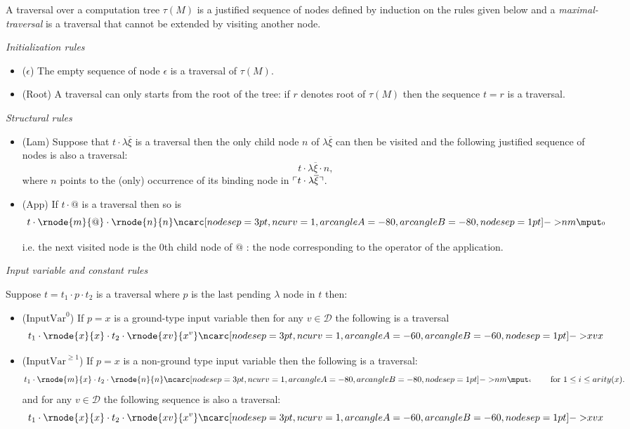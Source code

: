 \begin{dfn}[Traversal]
\label{def:traversal} A traversal over a computation tree $\tau(M)$
is a justified sequence of nodes defined by induction on the rules
given below and a \emph{maximal-traversal} is a traversal that cannot be
extended by visiting another node.

\emph{Initialization rules}
\begin{itemize}
\item ($\epsilon$) The empty sequence of node $\epsilon$ is a traversal of $\tau(M)$.

\item (Root) A traversal can only starts from the root of the tree: if $r$ denotes root of $\tau(M)$ then the sequence $t = r$
is a traversal.
\end{itemize}


\emph{Structural rules}
\begin{itemize}
\item (Lam) Suppose that $t \cdot \lambda \overline{\xi}$ is a traversal then the only child
node $n$ of $\lambda \overline{\xi}$ can then be visited and the
following justified sequence of nodes is also a traversal:
$$t \cdot \lambda \overline{\xi} \cdot n,$$
where $n$ points to the (only) occurrence of its binding node in $\ulcorner t \cdot \lambda \overline{\xi} \urcorner$.

\item (App) If $t \cdot @$ is a traversal then so is
$$t \cdot \rnode{m}{@} \cdot
\rnode{n}{n} \bkptra[nodesep=1pt]{80}{n}{m} \bklabelb{0}
$$

i.e. the next visited node is the $0$th child node of $@$ : the
node corresponding to the operator of the application.
\end{itemize}

\emph{Input variable and constant rules}

Suppose $t = t_1 \cdot p \cdot t_2$ is a traversal where $p$ is the last pending $\lambda$ node in $t$ then:
\begin{itemize}
\item ($\mbox{InputVar}^0$) If $p = x$ is a ground-type input variable then for any $v \in \mathcal{D}$
the following is a traversal
$$t_1 \cdot \rnode{x}{x} \cdot t_2 \cdot \rnode{xv}{x^v}
\bkptra[nodesep=1pt]{60}{xv}{x}$$


\item ($\mbox{InputVar}^{\geq 1}$) If $p = x$ is a non-ground type input variable then the following is a traversal:
$$t_1 \cdot \rnode{m}{x} \cdot t_2 \cdot
\rnode{n}{n} \bkptra[nodesep=1pt]{80}{n}{m} \bklabelb{i} \qquad
\mbox{ for } 1 \leq i \leq arity(x).$$
and for any $v\in \mathcal{D}$ the following sequence is also a traversal:
$$t_1 \cdot \rnode{x}{x} \cdot t_2 \cdot \rnode{xv}{x^v}
\bkptra[nodesep=1pt]{60}{xv}{x}$$


\end{itemize}
\end{dfn}

